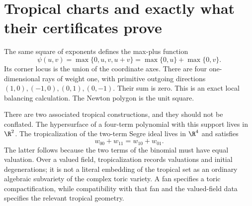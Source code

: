 \documentclass[11pt,oneside,openany]{book}
\theoremstyle{definition}\newtheorem{definition}[theorem]{Definition}
\theoremstyle{remark}\newtheorem{remark}[theorem]{Remark}
\begin{document}
\section{Tropical charts and exactly what their certificates prove}
The same square of exponents defines the max-plus function
\[
 \psi(u,v)=\max\{0,u,v,u+v\}=\max\{0,u\}+\max\{0,v\}.
\]
Its corner locus is the union of the coordinate axes. There are four
one-dimensional rays of weight one, with primitive outgoing directions
$(1,0),(-1,0),(0,1),(0,-1)$. Their sum is zero. This is an exact local
balancing calculation. The Newton polygon is the unit square.

\begin{center}
\end{center}

There are two associated tropical constructions, and they should not be
conflated. The hypersurface of a four-term polynomial with this support
lives in $\R^2$. The tropicalization of the two-term Segre ideal lives in
$\R^4$ and satisfies
\[
 w_{00}+w_{11}=w_{10}+w_{01}.
\]
The latter follows because the two terms of the binomial must have equal
valuation. Over a valued field, tropicalization records valuations and
initial degenerations; it is not a literal embedding of the tropical
set as an ordinary algebraic subvariety of the complex toric variety.
A fan specifies a toric compactification, while compatibility with that
fan and the valued-field data specifies the relevant tropical geometry.
\end{document}
